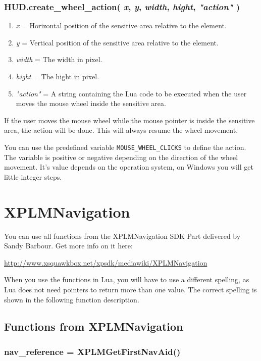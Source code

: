 \documentclass[11pt,parskip=half,a4paper]{scrartcl}
\begin{document}
\subsubsection{HUD.create\_wheel\_action( \emph{x}, \emph{y}, \emph{width}, \emph{hight}, \emph{"action"} )}

\begin{enumerate}
	\item \emph{x} = Horizontal position of the sensitive area relative to the element.
	\item \emph{y} = Vertical position of the sensitive area relative to the element.
	\item \emph{width} = The width in pixel.
	\item \emph{hight} = The hight in pixel.
	\item \emph{"action"} = A string containing the Lua code to be executed when the user moves the mouse wheel inside the sensitive area.
\end{enumerate}

If the user moves the mouse wheel while the mouse pointer is inside the sensitive area, the action will be done. This will always resume the wheel movement.

You can use the predefined variable \verb|MOUSE_WHEEL_CLICKS| to define the action. The variable is positive or negative depending on the direction of the wheel movement. It's value depends on the operation system, on Windows you will get little integer steps.


\newpage
\section{XPLMNavigation}

You can use all functions from the XPLMNavigation SDK Part delivered by Sandy Barbour. Get more info on it here:

\url{http://www.xsquawkbox.net/xpsdk/mediawiki/XPLMNavigation}

When you use the functions in Lua, you will have to use a different spelling, as Lua does not need pointers to return more than one value. The correct spelling is shown in the following function description.

\subsection{Functions from XPLMNavigation}

\subsubsection{nav\_reference = XPLMGetFirstNavAid()}
\end{document}
